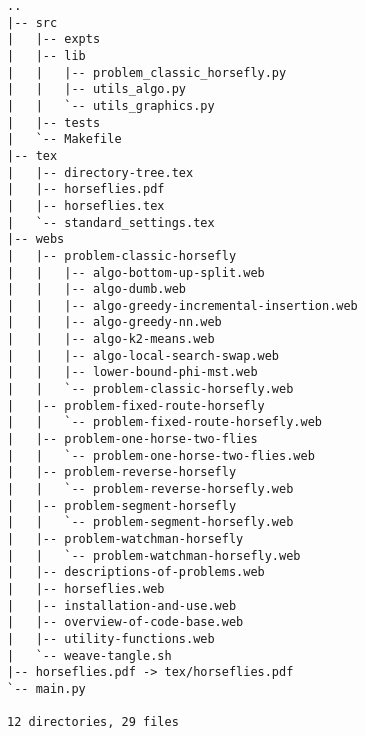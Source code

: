 \begin{verbatim}
..
|-- src
|   |-- expts
|   |-- lib
|   |   |-- problem_classic_horsefly.py
|   |   |-- utils_algo.py
|   |   `-- utils_graphics.py
|   |-- tests
|   `-- Makefile
|-- tex
|   |-- directory-tree.tex
|   |-- horseflies.pdf
|   |-- horseflies.tex
|   `-- standard_settings.tex
|-- webs
|   |-- problem-classic-horsefly
|   |   |-- algo-bottom-up-split.web
|   |   |-- algo-dumb.web
|   |   |-- algo-greedy-incremental-insertion.web
|   |   |-- algo-greedy-nn.web
|   |   |-- algo-k2-means.web
|   |   |-- algo-local-search-swap.web
|   |   |-- lower-bound-phi-mst.web
|   |   `-- problem-classic-horsefly.web
|   |-- problem-fixed-route-horsefly
|   |   `-- problem-fixed-route-horsefly.web
|   |-- problem-one-horse-two-flies
|   |   `-- problem-one-horse-two-flies.web
|   |-- problem-reverse-horsefly
|   |   `-- problem-reverse-horsefly.web
|   |-- problem-segment-horsefly
|   |   `-- problem-segment-horsefly.web
|   |-- problem-watchman-horsefly
|   |   `-- problem-watchman-horsefly.web
|   |-- descriptions-of-problems.web
|   |-- horseflies.web
|   |-- installation-and-use.web
|   |-- overview-of-code-base.web
|   |-- utility-functions.web
|   `-- weave-tangle.sh
|-- horseflies.pdf -> tex/horseflies.pdf
`-- main.py

12 directories, 29 files
\end{verbatim}
